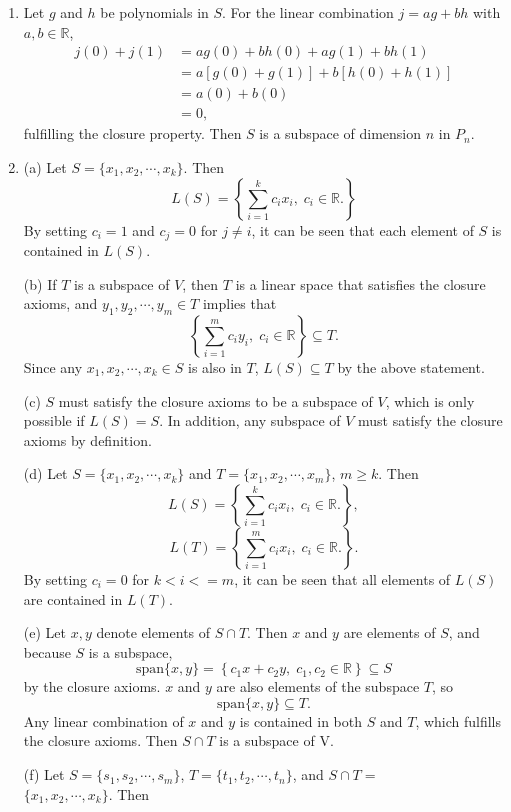 \documentclass[a4paper,12pt]{article}
\begin{document}
\begin{enumerate}
		\item Let $g$ and $h$ be polynomials in $S$. For the linear combination $j = ag + bh$ with $a, b \in \mathbb{R}$,
		\begin{align*}
		j(0) + j(1) &= ag(0) + bh(0) + ag(1) + bh(1) \\
		&= a\left[g(0) + g(1)\right] + b\left[h(0) + h(1)\right] \\
		&= a(0) + b(0) \\
		&= 0,
		\end{align*}
		fulfilling the closure property. Then $S$ is a subspace of dimension $n$ in $P_n$.
		
		\setcounter{enumi}{24}
		\item (a) Let $S = \{x_1, x_2, \cdots, x_k\}$. Then
		\[ L(S) = \left\{\sum_{i = 1}^k c_i x_i, \; c_i \in \mathbb{R}.\right\} \]
		By setting $c_i = 1$ and $c_j = 0$ for $j \neq i$, it can be seen that each element of $S$ is contained in $L(S)$. \par
		(b) If $T$ is a subspace of $V$, then $T$ is a linear space that satisfies the closure axioms, and $y_1, y_2, \cdots, y_m \in T$ implies that
		\[ \left\{\sum_{i = 1}^m c_i y_i, \; c_i \in \mathbb{R}\right\} \subseteq T.\]
		Since any $x_1, x_2, \cdots, x_k \in S$ is also in $T$, $L(S) \subseteq T$ by the above statement. \par
		(c) $S$ must satisfy the closure axioms to be a subspace of $V$, which is only possible if $L(S) = S$. In addition, any subspace of $V$ must satisfy the closure axioms by definition. \par
		(d) Let $S = \{x_1, x_2, \cdots, x_k\}$ and $T = \{x_1, x_2, \cdots, x_m\}$, $m \geq k$. Then
		\[ L(S) = \left\{\sum_{i = 1}^k c_i x_i, \; c_i \in \mathbb{R}.\right\}, \]
		\[ L(T) = \left\{\sum_{i = 1}^m c_i x_i, \; c_i \in \mathbb{R}.\right\}. \]
		By setting $c_i = 0$ for $k < i <= m$, it can be seen that all elements of $L(S)$ are contained in $L(T)$. \par
		(e) Let $x, y$ denote elements of $S \cap T$. Then $x$ and $y$ are elements of $S$, and because $S$ is a subspace,
		\[ \mbox{span}\{x, y\} = \left\{c_1 x + c_2 y, \; c_1, c_2 \in \mathbb{R} \right\} \subseteq S \]
		by the closure axioms. $x$ and $y$ are also elements of the subspace $T$, so
		\[ \mbox{span}\{x, y\} \subseteq T. \]
		Any linear combination of $x$ and $y$ is contained in both $S$ and $T$, which fulfills the closure axioms. Then $S \cap T$ is a subspace of V. \par
		(f) Let $S = \{s_1, s_2, \cdots, s_m\}$, $T = \{t_1, t_2, \cdots, t_n\}$, and $S \cap T =$\\$\{x_1, x_2, \cdots, x_k\}$. Then

\end{enumerate}
\end{document}
